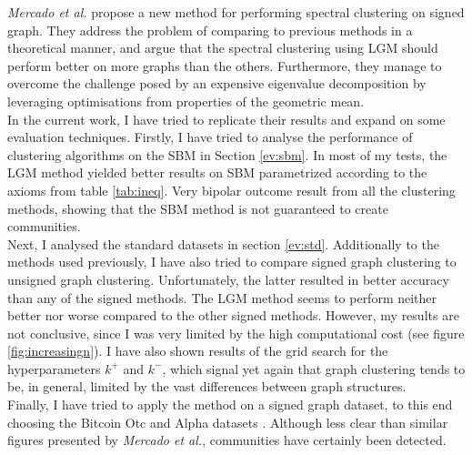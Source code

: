 \documentclass[11pt]{article}
\begin{document}
  \emph{Mercado et al.} \cite{mercado2016clustering} propose a new method for 
  performing spectral clustering on signed graph. They address the problem of 
  comparing to previous methods in a theoretical manner, and argue that the 
  spectral clustering using LGM should perform better on more graphs than the others.
  Furthermore, they manage to overcome the challenge posed by an expensive 
  eigenvalue decomposition by leveraging optimisations from properties of the 
  geometric mean. \\
  In the current work, I have tried to replicate their results and expand on 
  some evaluation techniques. 
  Firstly, I have tried to analyse the performance of clustering algorithms on the 
  SBM in Section \ref{ev:sbm}. In most of my tests, the LGM method yielded better
  results on SBM parametrized according to the axioms from table \ref{tab:ineq}.
  Very bipolar outcome result from all the clustering methods, showing that the 
  SBM method is not guaranteed to create communities. \\
  Next, I analysed the standard datasets in section \ref{ev:std}. Additionally to 
  the methods used previously, I have also tried to compare signed graph clustering
  to unsigned graph clustering. Unfortunately, the latter resulted in better
  accuracy than any of the signed methods. The LGM method seems to perform
  neither better nor worse compared to the other signed methods. However, my results
  are not conclusive, since I was very limited by the high computational cost (see 
  figure \ref{fig:increasingn}). I have also shown results of the grid search
  for the hyperparameters $k^+$ and $k^-$, which signal yet again that graph
  clustering tends to be, in general, limited by the vast differences between 
  graph structures. \\
   
  Finally, I have tried to apply the method on a signed graph dataset, to this end
  choosing the Bitcoin Otc and Alpha datasets \cite{kumar2016edge}. Although less 
  clear than similar figures presented by \emph{Mercado et al.}, communities have 
  certainly been detected. \\



\end{document}
